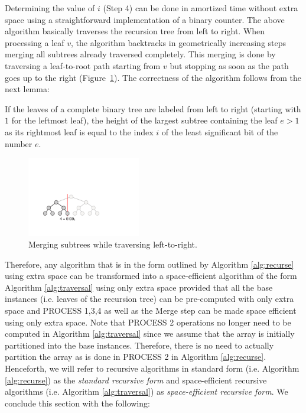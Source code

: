Determining the value of $i$ (Step 4) can be done in  amortized
time without extra space using a straightforward implementation of a
binary counter.  The above algorithm basically traverses the recursion
tree from left to right. When processing a leaf $v$, the algorithm
backtracks in geometrically increasing steps merging all subtrees
already traversed completely. This merging is done by traversing a
leaf-to-root path starting from $v$ but stopping as soon as the path
goes up to the right (Figure~\ref{fig:tree_spaceefficient}). The
correctness of the algorithm follows from the next
lemma\cite{cormen:alg}:

\begin{lemma}
  If the leaves of a complete binary tree are labeled from left to
  right (starting with $1$ for the leftmost leaf), the height of the
  largest subtree containing the leaf $e>1$ as its rightmost leaf is
  equal to the index $i$ of the least significant bit of the number
  $e$.
\end{lemma}

\begin{figure}
  \centerline{\includegraphics[height=3.5cm]{tree_spaceefficient}}
  \caption{Merging subtrees while traversing left-to-right.}
  \label{fig:tree_spaceefficient}
\end{figure}

Therefore, any algorithm that is in the form outlined by Algorithm
\ref{alg:recurse} using  extra space can be transformed
into a space-efficient algorithm of the form Algorithm \ref{alg:traversal}
using only  extra space provided that all the base instances
(i.e. leaves of the recursion tree) can be pre-computed with only  extra
space and PROCESS 1,3,4 as well as the Merge step can be made
space efficient using only  extra space. Note that PROCESS 2
operations no longer need to be computed in Algorithm \ref{alg:traversal}
since we assume that the array is initially partitioned into the
base instances. Therefore, there is no need to actually partition
the array as is done in PROCESS 2 in Algorithm \ref{alg:recurse}. Henceforth, we will refer
to recursive algorithms in standard form (i.e. Algorithm
\ref{alg:recurse}) as the {\em standard recursive form} and
space-efficient recursive algorithms (i.e. Algorithm \ref{alg:traversal})
as {\em space-efficient recursive form}. We conclude this section
with the following:

